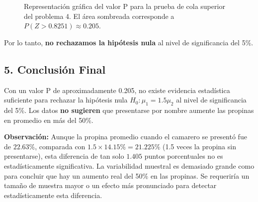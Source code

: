 \documentclass[12pt]{article}
\begin{document}
\begin{figure}[H]
\centering
{}
\caption{Representación gráfica del valor P para la prueba de cola superior del problema 4. El área sombreada corresponde a $P(Z>0.8251) \approx 0.205$.}
\end{figure}

Por lo tanto, \textbf{no rechazamos la hipótesis nula} al nivel de significancia del 5\%.

\subsection*{5. Conclusión Final}

Con un valor P de aproximadamente 0.205, no existe evidencia estadística suficiente para rechazar la hipótesis nula $H_0: \mu_1 = 1.5\mu_2$ al nivel de significancia del 5\%. Los datos \textbf{no sugieren} que presentarse por nombre aumente las propinas en promedio en más del 50\%.

\textbf{Observación:} Aunque la propina promedio cuando el camarero se presentó fue de $22.63\%$, comparada con $1.5 \times 14.15\% = 21.225\%$ (1.5 veces la propina sin presentarse), esta diferencia de tan solo $1.405$ puntos porcentuales no es estadísticamente significativa. La variabilidad muestral es demasiado grande como para concluir que hay un aumento real del 50\% en las propinas. Se requeriría un tamaño de muestra mayor o un efecto más pronunciado para detectar estadísticamente esta diferencia.
\end{document}

